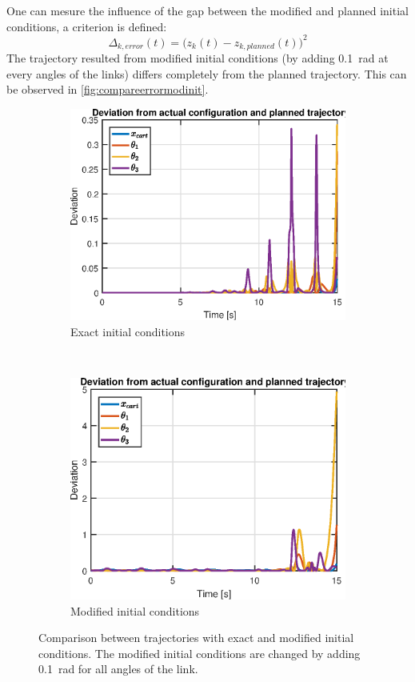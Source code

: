 \documentclass[a4paper,12pt]{article}
\begin{document}
One can mesure the influence of the gap between the modified and planned initial conditions, a criterion is defined:
\[\Delta_{k,error}(t) = \big(z_k(t)-z_{k,planned}(t)\big)^2\]
The trajectory resulted from modified initial conditions (by adding \SI{0.1}{\radian} at every angles of the links) differs completely from the planned trajectory. This can be observed in \autoref{fig:compareerrormodinit}.
\begin{figure}[H]
    \centering
    \begin{subfigure}[h]{0.48\textwidth}
        \centering
        \includegraphics[width=1\textwidth]{illustrations/graph_error_init.eps}
        \caption{Exact initial conditions}
    \end{subfigure}%
    ~
    \begin{subfigure}[h]{0.48\textwidth}
        \centering
        \includegraphics[width=1\textwidth]{illustrations/graph_error_mod.eps}
        \caption{Modified initial conditions}
    \end{subfigure}
    \caption{Comparison between trajectories with exact and modified initial conditions. The modified initial conditions are changed by adding \SI{0.1}{\radian} for all angles of the link.}
    \label{fig:compareerrormodinit}
\end{figure}
\end{document}
